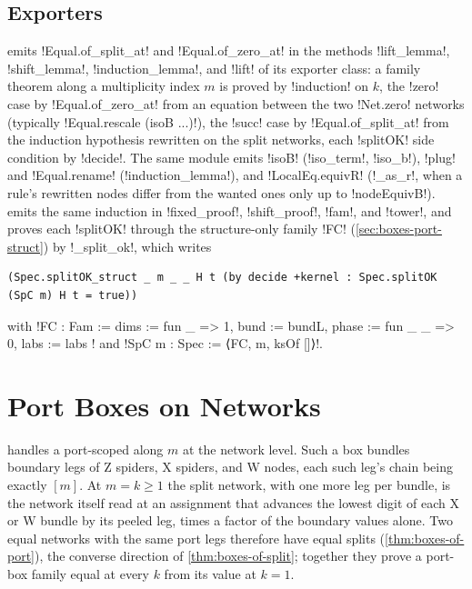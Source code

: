 {\subsection{Exporters}\label{sec:boxes-bundle-export}
 emits \lbx!Equal.of_split_at! and \lbx!Equal.of_zero_at! in the methods \py!lift_lemma!, \py!shift_lemma!, \py!induction_lemma!, and \py!lift! of its exporter class: a family theorem along a multiplicity index $m$ is proved by \lbx!induction! on $k$, the \lbx!zero! case by \lbx!Equal.of_zero_at! from an equation between the two \lbx!Net.zero! networks (typically \lbx!Equal.rescale (isoB ...)!), the \lbx!succ! case by \lbx!Equal.of_split_at! from the induction hypothesis rewritten on the split networks, each \lbx!splitOK! side condition by \lbx!decide!. The same module emits \lbx!isoB! (\py!iso_term!, \py!iso_b!), \lbx!plug! and \lbx!Equal.rename! (\py!induction_lemma!), and \lbx!LocalEq.equivR! (\py!_as_r!, when a rule's rewritten nodes differ from the wanted ones only up to \lbx!nodeEquivB!).  emits the same induction in \py!fixed_proof!, \py!shift_proof!, \py!fam!, and \py!tower!, and proves each \lbx!splitOK! through the structure-only family \lbx!FC! (\cref{sec:boxes-port-struct}) by \py!_split_ok!, which writes
\begin{lstlisting}[style=leanbox]
(Spec.splitOK_struct _ m _ _ H t (by decide +kernel : Spec.splitOK (SpC m) H t = true))
\end{lstlisting}
with \lbx!FC : Fam := { dims := fun _ => 1, bund := bundL, phase := fun _ _ => 0, labs := labs }! and \lbx!SpC m : Spec := ⟨FC, m, ksOf []⟩!.

\section{Port Boxes on Networks}\label{sec:boxes-port}

 handles a port-scoped \bbox{} along $m$ at the network level. Such a box bundles boundary legs of Z spiders, X spiders, and W nodes, each such leg's chain being exactly $[m]$. At $m=k\ge1$ the split network, with one more leg per bundle, is the network itself read at an assignment that advances the lowest digit of each X or W bundle by its peeled leg, times a factor of the boundary values alone. Two equal networks with the same port legs therefore have equal splits (\cref{thm:boxes-of-port}), the converse direction of \cref{thm:boxes-of-split}; together they prove a port-box family equal at every $k$ from its value at $k=1$.

}
